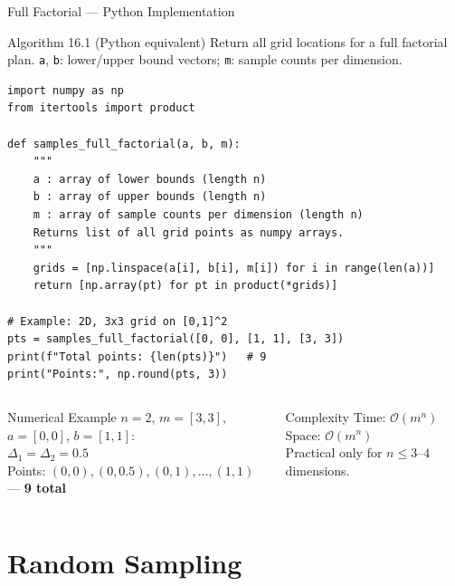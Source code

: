 \documentclass[aspectratio=169,10pt]{beamer}
\begin{document}
\begin{frame}[fragile]{Full Factorial --- Python Implementation}
  \begin{block}{Algorithm 16.1 (Python equivalent)}
    Return all grid locations for a full factorial plan.
    \texttt{a}, \texttt{b}: lower/upper bound vectors; \texttt{m}: sample counts per dimension.
  \end{block}
  \begin{lstlisting}[style=python, caption={Full factorial sampling (NumPy)}]
import numpy as np
from itertools import product

def samples_full_factorial(a, b, m):
    """
    a : array of lower bounds (length n)
    b : array of upper bounds (length n)
    m : array of sample counts per dimension (length n)
    Returns list of all grid points as numpy arrays.
    """
    grids = [np.linspace(a[i], b[i], m[i]) for i in range(len(a))]
    return [np.array(pt) for pt in product(*grids)]

# Example: 2D, 3x3 grid on [0,1]^2
pts = samples_full_factorial([0, 0], [1, 1], [3, 3])
print(f"Total points: {len(pts)}")   # 9
print("Points:", np.round(pts, 3))
  \end{lstlisting}
  \begin{columns}
    \begin{exampleblock}{Numerical Example}
      $n=2$, $m=[3,3]$, $a=[0,0]$, $b=[1,1]$:\\
      $\Delta_1 = \Delta_2 = 0.5$\\
      Points: $(0,0),(0,0.5),(0,1),\ldots,(1,1)$ --- \textbf{9 total}
    \end{exampleblock}
    \begin{exampleblock}{Complexity}
      Time: $\mathcal{O}(m^n)$\quad Space: $\mathcal{O}(m^n)$\\
      Practical only for $n \le 3$--$4$ dimensions.
    \end{exampleblock}
  \end{columns}
\end{frame}

\section{Random Sampling}
\end{document}
